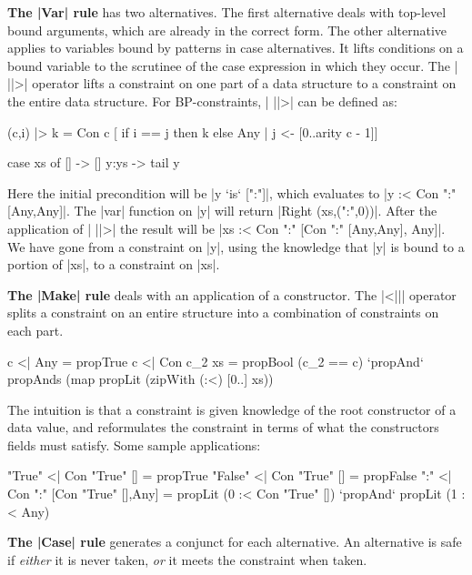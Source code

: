 \documentclass[preprint]{sigplanconf}
\newcommand{\para}[1]{\vspace{2mm}\noindent\textbf{#1}}
\begin{document}
\para{The |Var| rule} has two alternatives. The first alternative deals with top-level bound arguments, which are already in the correct form. The other alternative applies to variables bound by patterns in case alternatives. It lifts conditions on a bound variable to the scrutinee of the case expression in which they occur. The | ||>| operator lifts a constraint on one part of a data structure to a constraint on the entire data structure. For BP-constraints, | ||>| can be defined as:

\begin{code}
(c,i) |> k = Con c  [  if i == j then k else Any
                    |  j <- [0..arity c - 1]]
\end{code}

\begin{example}
\ignore\begin{code}
case  xs of
      []    -> []
      y:ys  -> tail y
\end{code}

Here the initial precondition will be |y `is` [":"]|, which evaluates to |y :< Con ":" [Any,Any]|. The |var| function on |y| will return |Right (xs,(":",0))|. After the application of | ||>| the result will be |xs :< Con ":" [Con ":" [Any,Any], Any]|. We have gone from a constraint on |y|, using the knowledge that |y| is bound to a portion of |xs|, to a constraint on |xs|.
\end{example}

\para{The |Make| rule} deals with an application of a constructor. The |<||| operator splits a constraint on an entire structure into a combination of constraints on each part.

\begin{code}
c <| Any         =  propTrue
c <| Con c_2 xs  =  propBool (c_2 == c) `propAnd`
                    propAnds (map propLit (zipWith (:<) [0..] xs))
\end{code}

The intuition is that a constraint is given knowledge of the root constructor of a data value, and reformulates the constraint in terms of what the constructors fields must satisfy. Some sample applications:

\begin{code}
"True"   <| Con "True" [] = propTrue
"False"  <| Con "True" [] = propFalse
":" <| Con ":" [Con "True" [],Any]  =
    propLit (0 :< Con "True" []) `propAnd` propLit (1 :< Any)
\end{code}

\para{The |Case| rule} generates a conjunct for each alternative. An alternative is safe if \textit{either} it is never taken, \textit{or} it meets the constraint when taken.
\end{document}
